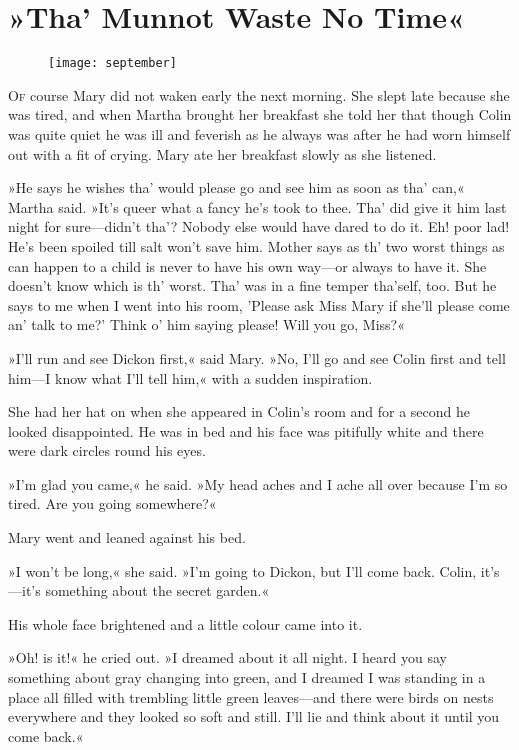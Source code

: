 \chapter{»Tha' Munnot Waste No Time«} 
	
\begin{figure}[t!]
\centering
\texttt{[image: september]}
\end{figure}

	\lettrine[lines=6]{O}{f} course Mary did not waken early the next morning. She slept late because she was tired, and when Martha brought her breakfast she told her that though Colin was quite quiet he was ill and feverish as he always was after he had worn himself out with a fit of crying. Mary ate her breakfast slowly as she listened.

»He says he wishes tha' would please go and see him as soon as tha' can,« Martha said. »It's queer what a fancy he's took to thee. Tha' did give it him last night for sure—didn't tha'? Nobody else would have dared to do it. Eh! poor lad! He's been spoiled till salt won't save him. Mother says as th' two worst things as can happen to a child is never to have his own way—or always to have it. She doesn't know which is th' worst. Tha' was in a fine temper tha'self, too. But he says to me when I went into his room, 'Please ask Miss Mary if she'll please come an' talk to me?' Think o' him saying please! Will you go, Miss?«

»I'll run and see Dickon first,« said Mary. »No, I'll go and see Colin first and tell him—I know what I'll tell him,« with a sudden inspiration.

She had her hat on when she appeared in Colin's room and for a second he looked disappointed. He was in bed and his face was pitifully white and there were dark circles round his eyes.

»I'm glad you came,« he said. »My head aches and I ache all over because I'm so tired. Are you going somewhere?«

Mary went and leaned against his bed.

»I won't be long,« she said. »I'm going to Dickon, but I'll come back. Colin, it's—it's something about the secret garden.«

His whole face brightened and a little colour came into it.

»Oh! is it!« he cried out. »I dreamed about it all night. I heard you say something about gray changing into green, and I dreamed I was standing in a place all filled with trembling little green leaves—and there were birds on nests everywhere and they looked so soft and still. I'll lie and think about it until you come back.«


